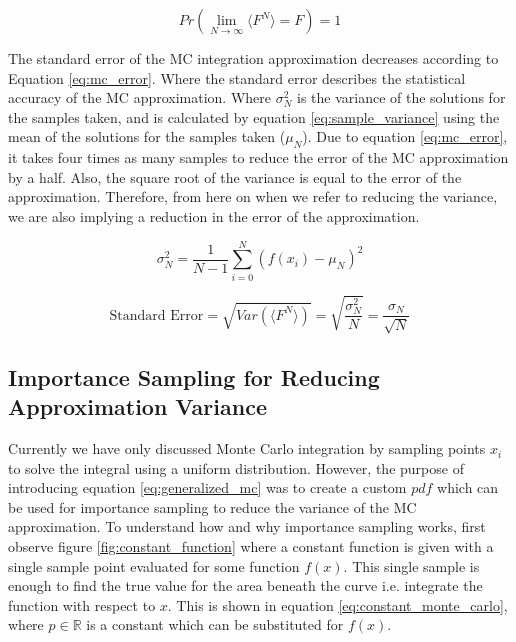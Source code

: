 \documentclass[../dissertation.tex]{subfiles}
\begin{document}
\begin{equation}
\label{eq:law_large_numbers}
Pr( \lim_{N \rightarrow \infty} \langle F^N \rangle = F ) = 1
\end{equation}

The standard error of the MC integration approximation decreases according to Equation \ref{eq:mc_error}. Where the standard error describes the statistical accuracy of the MC approximation. Where $\sigma_N^2$ is the variance of the solutions for the samples taken, and is calculated by equation \ref{eq:sample_variance} using the mean of the solutions for the samples taken ($\mu_N$). Due to equation \ref{eq:mc_error}, it takes four times as many samples to reduce the error of the MC approximation by a half. Also, the square root of the variance is equal to the error of the approximation. Therefore, from here on when we refer to reducing the variance, we are also implying a reduction in the error of the approximation.

\begin{equation}
\label{eq:sample_variance}
\sigma_N^2 = \frac{1}{N-1} \sum_{i=0}^N (f(x_i) - \mu_N)^2
\end{equation}

\begin{equation}
\label{eq:mc_error}
\text{Standard Error} = \sqrt{Var(\langle F^N \rangle)} = \sqrt{\frac{\sigma_N^2}{N}} = \frac{\sigma_N}{\sqrt{N}}
\end{equation}

\subsection{Importance Sampling for Reducing Approximation Variance}
\label{sec:importance_sampling}

Currently we have only discussed Monte Carlo integration by sampling points $x_i$ to solve the integral using a uniform distribution. However, the purpose of introducing equation \ref{eq:generalized_mc} was to create a custom $pdf$ which can be used for importance sampling to reduce the variance of the MC approximation. To understand how and why importance sampling works, first observe figure \ref{fig:constant_function} where a constant function is given with a single sample point evaluated for some function $f(x)$. This single sample is enough to find the true value for the area beneath the curve i.e. integrate the function with respect to $x$. This is shown in equation \ref{eq:constant_monte_carlo}, where $p \in \mathbb{R}$ is a constant which can be substituted for $f(x)$.
\end{document}
